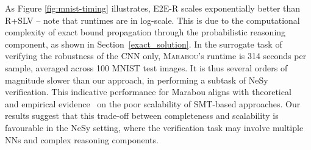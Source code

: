 As Figure \ref{fig:mnist-timing} illustrates, \textsc{E2E-R} scales exponentially better than \textsc{R+SLV} -- note that runtimes are in log-scale. This is due to the computational complexity of exact bound propagation through the probabilistic reasoning component, as shown in Section~\ref{exact_solution}. In the surrogate task of verifying the robustness of the CNN only, \textsc{Marabou}'s runtime is 314 seconds per sample, averaged across 100 MNIST test images. It is thus several orders of magnitude slower than our approach, in performing a subtask of NeSy verification. %
This indicative performance for Marabou aligns with theoretical~\cite{crownZhang2018} and empirical evidence~\cite{vnnlib2024} on the poor scalability of SMT-based approaches. Our results suggest that this trade-off between completeness and scalability is favourable in the NeSy setting, where the verification task may involve multiple NNs and complex reasoning components.




